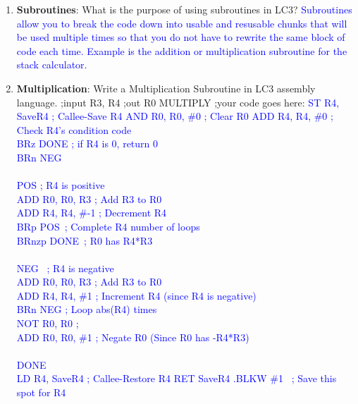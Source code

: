 \documentclass{article}
\begin{document}
\begin{enumerate}[label=(\alph*)]
    \item \textbf{Subroutines}: What is the purpose of using subroutines in LC3?
    \newline\textcolor{blue}{ Subroutines allow you to break the code down into usable and resusable chunks that will be used multiple times so that you do not have to rewrite the same block of code each time. Example is the addition or multiplication subroutine for the stack calculator.
    }
    \item \textbf{Multiplication}: Write a Multiplication Subroutine in LC3 assembly language.
    \newline
    ;input R3, R4 \newline
    ;out R0 \newline
    MULTIPLY \newline
    ;your code goes here: \newline
    \newline\textcolor{blue}{
    ST R4, SaveR4    \qquad \quad ; Callee-Save R4 \newline
    AND R0, R0, \#0   \qquad ; Clear R0 \newline
    ADD R4, R4, \#0 \qquad ; Check R4's condition code \\
    BRz DONE \qquad \qquad \enskip; if R4 is 0, return 0\\
    BRn NEG \qquad \qquad \quad \\
    \\
    POS \qquad \qquad \qquad \quad \enskip ; R4 is positive\\
    ADD R0, R0, R3 \qquad ; Add R3 to R0\\
    ADD R4, R4, \#-1 \quad \enskip ; Decrement R4\\
    BRp POS \qquad \qquad \quad \,; Complete R4 number of loops\\
    BRnzp DONE \qquad \quad \,; R0 has R4*R3\\
    \\
    NEG \qquad \qquad \qquad \quad  \, ; R4 is negative\\
    ADD R0, R0, R3 \qquad ; Add R3 to R0\\
    ADD R4, R4, \#1 \qquad ; Increment R4 (since R4 is negative)\\
    BRn NEG \qquad \qquad \quad ; Loop abs(R4) times\\
    NOT R0, R0 \qquad \qquad ; \\
    ADD R0, R0, \#1 \qquad ; Negate R0 (Since R0 has -R4*R3)\\
    \\
    DONE \\
    LD R4, SaveR4 \qquad \quad ; Callee-Restore R4
    \newline
    RET
    \newline
    SaveR4 .BLKW \#1 \quad \, ; Save this spot for R4}


\end{enumerate}
\end{document}
